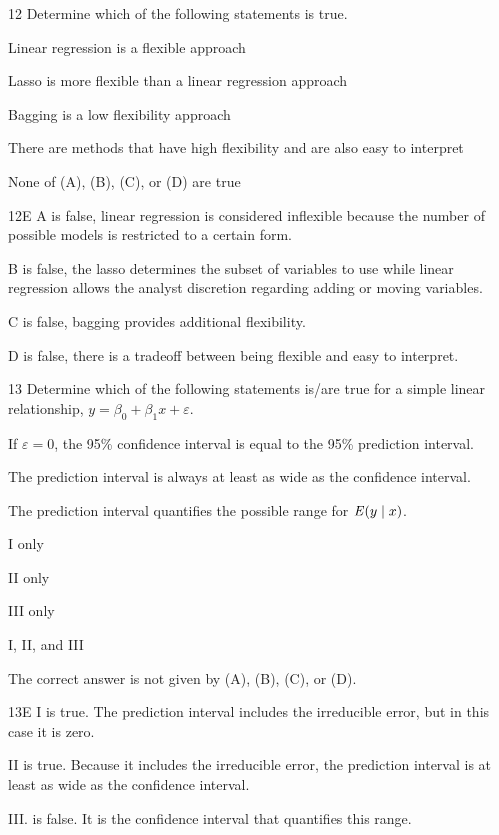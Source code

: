\begin{question}{12}
Determine which of the following statements is true.

\begin{choices}
\item Linear regression is a flexible approach
\item Lasso is more flexible than a linear regression approach
\item Bagging is a low flexibility approach
\item There are methods that have high flexibility and are also easy to interpret
\item None of (A), (B), (C), or (D) are true
\end{choices}
\end{question}
\begin{solution}{12}{E}
A is false, linear regression is considered inflexible because the number of possible models is restricted to a certain form.

B is false, the lasso determines the subset of variables to use while linear regression allows the analyst discretion regarding adding or moving variables.

C is false, bagging provides additional flexibility.

D is false, there is a tradeoff between being flexible and easy to interpret.
\end{solution}

\begin{question}{13}
Determine which of the following statements is/are true for a simple linear relationship, $y = \beta_0 + \beta_1 x + \varepsilon$.
\begin{statements}
\item If $\varepsilon = 0$, the 95\% confidence interval is equal to the 95\% prediction interval.
\item The prediction interval is always at least as wide as the confidence interval.
\item The prediction interval quantifies the possible range for $\operatorname{\mathit{E}}(y \mid x)$.
\end{statements}

\begin{choices}
\item I only
\item II only
\item III only
\item I, II, and III
\item The correct answer is not given by (A), (B), (C), or (D).
\end{choices}
\end{question}
\begin{solution}{13}{E}
I is true. The prediction interval includes the irreducible error, but in this case it is zero.

II is true. Because it includes the irreducible error, the prediction interval is at least as wide as the confidence interval.

III. is false. It is the confidence interval that quantifies this range.
\end{solution}


